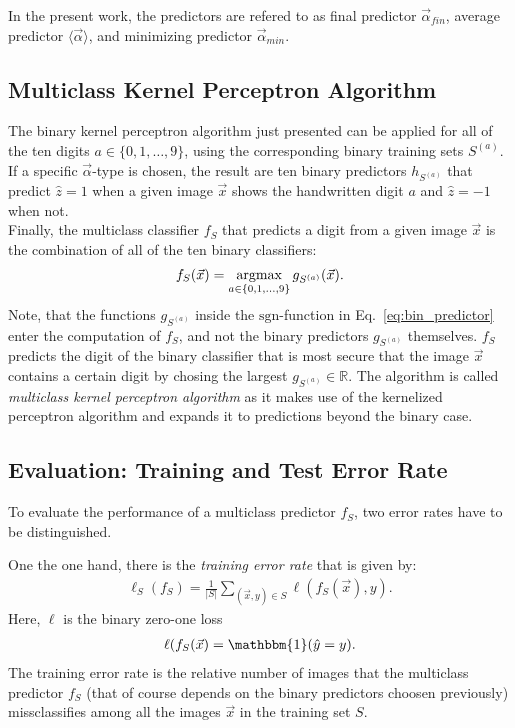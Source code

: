 In the present work, the predictors are refered to as final predictor $\vec{\alpha}_{fin}$, average predictor $\langle \vec{\alpha} \rangle$, and minimizing predictor $\vec{\alpha}_{min}$.

\subsection{Multiclass Kernel Perceptron Algorithm}

The binary kernel perceptron algorithm just presented can be applied for all of the ten digits $a \in \{0, 1, \dots, 9\}$, using the corresponding binary training sets $S^{(a)}$. If a specific $\vec{\alpha}$-type is chosen, the result are ten binary predictors $h_{S^{(a)}}$ that predict $\hat{z} = 1$ when a given image $\vec{x}$ shows the handwritten digit $a$ and $\hat{z} = -1$ when not. \\

Finally, the multiclass classifier $f_S$ that predicts a digit from a given image $\vec{x}$ is the combination of all of the ten binary classifiers:
\begin{align*}
	f_S(\vec{x}) = \operatorname*{argmax}_{a \in \{0, 1, \dots, 9\}} g_{S^{(a)}}(\vec{x}).
\end{align*}
Note, that the functions $g_{S^{(a)}}$ inside the $\mathrm{sgn}$-function in Eq.~\ref{eq:bin_predictor} enter the computation of $f_S$, and not the binary predictors $g_{S^{(a)}}$ themselves.
$f_S$ predicts the digit of the binary classifier that is most secure that the image $\vec{x}$ contains a certain digit by chosing the largest $g_{S^{(a)}}\in\mathbb{R}$. The algorithm is called \textit{multiclass kernel perceptron algorithm} as it makes use of the kernelized perceptron algorithm and expands it to predictions beyond the binary case\cite{multiclass2005}.

\subsection{Evaluation: Training and Test Error Rate}

To evaluate the performance of a multiclass predictor $f_S$, two error rates have to be distinguished. 

One the one hand, there is the \textit{training error rate} that is given by:
\begin{align}\label{eq:training_error}
	\ell_{S}(f_S) = \frac{1}{|S|} \sum_{(\vec{x}, y) \in S} \ell(f_S(\vec{x}), y).
\end{align}
Here, $\ell$ is the binary zero-one loss
\begin{align*}
	\ell(f_S(\vec{x}) = \mathbbm{1}(\hat{y} = y).
\end{align*}
The training error rate is the relative number of images that the multiclass predictor $f_S$ (that of course depends on the binary predictors choosen previously) missclassifies among all the images $\vec{x}$ in the training set $S$.

